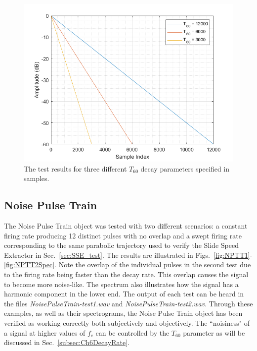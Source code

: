 \documentclass[../main.tex]{subfiles}
\begin{document}
\begin{figure}[ht]
    \centering
    \includegraphics[scale=.65]{./images/plots/ExpDecayTest1.png}
    \caption{The test results for three different $T_{60}$ decay parameters specified in samples.}
    \label{fig:ExpDecayTest1}
\end{figure}

\clearpage
 
\subsection{Noise Pulse Train}
The Noise Pulse Train object was tested with two different scenarios: a constant firing rate producing 12 distinct pulses with no overlap and a swept firing rate corresponding to the same parabolic trajectory used to verify the Slide Speed Extractor in Sec.~\ref{sec:SSE_test}. The results are illustrated in Figs.~\ref{fig:NPTT1}-\ref{fig:NPTT2Spec}. Note the overlap of the individual pulses in the second test due to the firing rate being faster than the decay rate. This overlap causes the signal to become more noise-like. The spectrum also illustrates how the signal has a harmonic component in the lower end. The output of each test can be heard in the files \emph{NoisePulseTrain-test1.wav} and \emph{NoisePulseTrain-test2.wav}. Through these examples, as well as their spectrograms, the Noise Pulse Train object has been verified as working correctly both subjectively and objectively. The ``noisiness" of a signal at higher values of $f_c$ can be controlled by the $T_{60}$ parameter as will be discussed in Sec.~\ref{subsec:Ch6DecayRate}.
\end{document}
